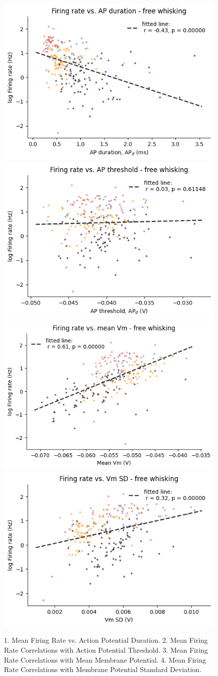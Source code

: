 \documentclass{IEEEtran}
\begin{document}
\begin{figure}[h!]
  \centering
  \includegraphics[width=0.45\columnwidth]{figures/given/3_Mean_FRvsAP_Duration.png}
  \includegraphics[width=0.45\columnwidth]{figures/given/8_Mean_FR_Correlations_APthreshold.png}
  \includegraphics[width=0.45\columnwidth]{figures/given/8_Mean_FR_Correlations_meanVm.png}
  \includegraphics[width=0.45\columnwidth]{figures/given/8_Mean_FR_Correlations_VmSD.png}
  \caption{1. Mean Firing Rate vs. Action Potential Duration. 2. Mean Firing Rate Correlations with Action Potential Threshold. 3. Mean Firing Rate Correlations with Mean Membrane Potential. 4. Mean Firing Rate Correlations with Membrane Potential Standard Deviation.}%
  \label{fig:3_8}
\end{figure}
\end{document}
